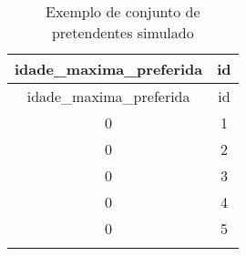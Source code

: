\documentclass[]{book}
\begin{document}
\begin{longtable}[]{@{}cc@{}}
\caption{Exemplo de conjunto de pretendentes simulado}\tabularnewline
\toprule
\begin{minipage}[b]{0.33\columnwidth}\centering\strut
idade\_maxima\_preferida
\strut\end{minipage} &
\begin{minipage}[b]{0.05\columnwidth}\centering\strut
id
\strut\end{minipage}\tabularnewline
\midrule
\endfirsthead
\toprule
\begin{minipage}[b]{0.33\columnwidth}\centering\strut
idade\_maxima\_preferida
\strut\end{minipage} &
\begin{minipage}[b]{0.05\columnwidth}\centering\strut
id
\strut\end{minipage}\tabularnewline
\midrule
\endhead
\begin{minipage}[t]{0.33\columnwidth}\centering\strut
0
\strut\end{minipage} &
\begin{minipage}[t]{0.05\columnwidth}\centering\strut
1
\strut\end{minipage}\tabularnewline
\begin{minipage}[t]{0.33\columnwidth}\centering\strut
0
\strut\end{minipage} &
\begin{minipage}[t]{0.05\columnwidth}\centering\strut
2
\strut\end{minipage}\tabularnewline
\begin{minipage}[t]{0.33\columnwidth}\centering\strut
0
\strut\end{minipage} &
\begin{minipage}[t]{0.05\columnwidth}\centering\strut
3
\strut\end{minipage}\tabularnewline
\begin{minipage}[t]{0.33\columnwidth}\centering\strut
0
\strut\end{minipage} &
\begin{minipage}[t]{0.05\columnwidth}\centering\strut
4
\strut\end{minipage}\tabularnewline
\begin{minipage}[t]{0.33\columnwidth}\centering\strut
0
\strut\end{minipage} &
\begin{minipage}[t]{0.05\columnwidth}\centering\strut
5
\strut\end{minipage}\tabularnewline
\begin{minipage}[t]{0.33\columnwidth}\centering\strut

\end{minipage}
\end{longtable}
\end{document}
